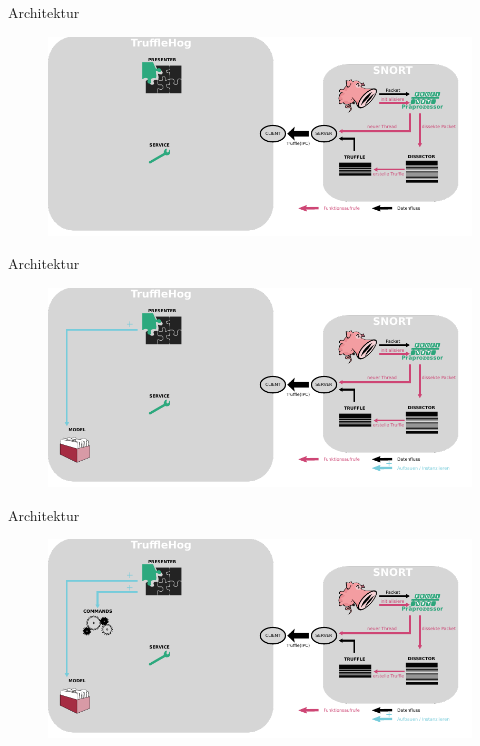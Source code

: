 \documentclass[18pt]{beamer}
\begin{document}
\begin{frame}{Architektur}
    \begin{figure}
    	\centering
    	\includegraphics[width=\textwidth]{./images/9.pdf}
    \end{figure}
\end{frame}

\begin{frame}{Architektur}
    \begin{figure}
    	\centering
    	\includegraphics[width=\textwidth]{./images/10.pdf}
    \end{figure}
\end{frame}

\begin{frame}{Architektur}
    \begin{figure}
    	\centering
    	\includegraphics[width=\textwidth]{./images/11.pdf}
    \end{figure}
\end{frame}
\end{document}

